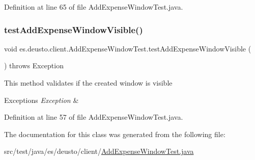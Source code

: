Definition at line 65 of file Add\+Expense\+Window\+Test.\+java.

\mbox{\label{classes_1_1deusto_1_1client_1_1_add_expense_window_test_abde6a6bf7c49590ba9bcf9e466193ff0}} 
\subsubsection{\texorpdfstring{test\+Add\+Expense\+Window\+Visible()}{testAddExpenseWindowVisible()}}
{\footnotesize\ttfamily void es.\+deusto.\+client.\+Add\+Expense\+Window\+Test.\+test\+Add\+Expense\+Window\+Visible (\begin{DoxyParamCaption}{ }\end{DoxyParamCaption}) throws Exception}

This method validates if the created window is visible 
\begin{DoxyExceptions}{Exceptions}
{\em Exception} & \\
\hline
\end{DoxyExceptions}


Definition at line 57 of file Add\+Expense\+Window\+Test.\+java.



The documentation for this class was generated from the following file\+:\begin{DoxyCompactItemize}
\item 
src/test/java/es/deusto/client/\hyperlink{_add_expense_window_test_8java}{Add\+Expense\+Window\+Test.\+java}\end{DoxyCompactItemize}

